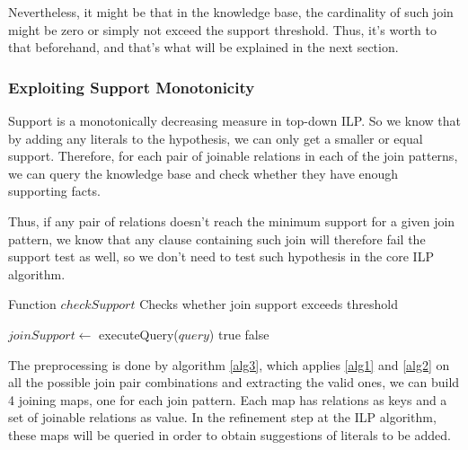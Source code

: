 Nevertheless, it might be that in the knowledge base, the cardinality of such join might be zero or simply not exceed
the support threshold. Thus, it's worth to that beforehand, and that's what will be explained in the next section.

\subsubsection{Exploiting Support Monotonicity}

Support is a monotonically decreasing measure in top-down ILP. So we know that by adding any
literals to the hypothesis, we can only get a smaller or equal support. Therefore, for each pair of joinable relations
in each of the join patterns, we can query the knowledge base and check whether they have enough supporting facts.

Thus, if any pair of relations doesn't reach the minimum support for a given join pattern, we know that any clause
containing such join will therefore fail the support test as well, so we don't need to test such hypothesis in the core
ILP algorithm.

\begin{algorithm}[!h]
  \caption{Function $checkSupport$ \newline Checks whether join support exceeds threshold}
  \label{alg2}
     {
    }
    $joinSupport \leftarrow$ executeQuery($query$)\;
      {
      \Return true\;
    }{
      \Return false\;
    }
\end{algorithm}


The preprocessing is done by algorithm \ref{alg3}, which applies \ref{alg1} and \ref{alg2} on all the possible join pair
combinations and extracting the valid ones, we can build 4 joining maps, one for each join pattern. Each map has
relations as keys and a set of joinable relations as value. In the refinement step at the ILP algorithm, these maps will
be queried in order to obtain suggestions of literals to be
added.

